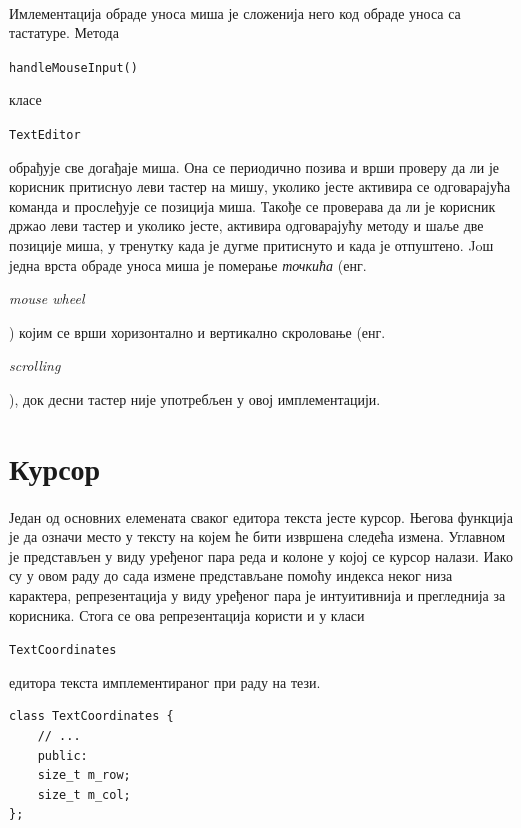 \documentclass[12pt,oneside]{memoir}
\begin{document}
\paragraph{}
Имлементација обраде уноса миша је сложенија него код обраде уноса са тастатуре. Метода
\begin{latinica}\verb|handleMouseInput()|\end{latinica}
класе \begin{latinica}\verb|TextEditor|\end{latinica} обрађује све догађаје
миша. Она се периодично позива и врши проверу да ли је корисник притиснуо леви тастер на 
мишу, уколико јесте активира се одговарајућа команда и прослеђује се позиција миша. 
Такође се проверава да ли је корисник држао леви тастер и уколико јесте, активира
одговарајућу методу и шаље две позиције миша, у тренутку када је дугме притиснуто и 
када је отпуштено. Joш једна врста обраде уноса миша је померање \emph{точкића} (енг. \begin{latinica}\textit{mouse wheel}\end{latinica}) којим се врши хоризонтално и 
вертикално скроловање (енг. \begin{latinica}\textit{scrolling}\end{latinica}), док
десни тастер није употребљен у овој имплементацији.


\section{Курсор} \label{cursor}
\paragraph{}
Један од основних елемената сваког едитора текста јесте курсор. Његова функција је да
означи место у тексту на којем ће бити извршена следећа измена. Углавном је представљен у 
виду уређеног пара реда и колоне у којој се курсор налази. Иако су у овом раду до сада
измене представљане помоћу индекса неког низа карактера, репрезентација у виду уређеног
пара је интуитивнија и прегледнија за корисника. Стога се ова репрезентација користи и
у класи \begin{latinica}\verb|TextCoordinates|\end{latinica} едитора текста имплементираног
при раду на тези.

\begin{verbatim}
class TextCoordinates {
	// ...
	public:
	size_t m_row;
	size_t m_col;
};
\end{verbatim}
\end{document}
